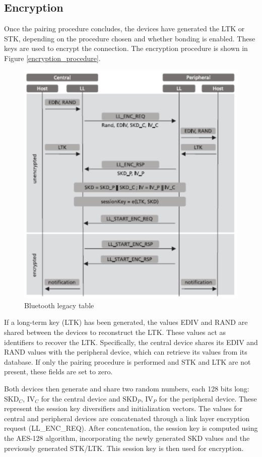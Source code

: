 \documentclass{Configuration_Files/PoliMi3i_thesis}
\begin{document}
\subsection{Encryption}

Once the pairing procedure concludes, the devices have generated the LTK or STK, depending on the procedure chosen and whether bonding is enabled. These keys are used to encrypt the connection. The encryption procedure is shown in Figure \ref{encryption_procedure}.

\begin{figure}[H]
    \centering
    \includegraphics[scale=0.7]{Bluetooth_Security/9.png}
    \caption{Bluetooth legacy table}
    \label{bluetooth_sec_9}
\end{figure}

If a long-term key (LTK) has been generated, the values EDIV and RAND are shared between the devices to reconstruct the LTK. These values act as identifiers to recover the LTK. Specifically, the central device shares its EDIV and RAND values with the peripheral device, which can retrieve its values from its database. If only the pairing procedure is performed and STK and LTK are not present, these fields are set to zero. 

Both devices then generate and share two random numbers, each 128 bits long: \( \text{SKD}_C \), \( \text{IV}_C \) for the central device and \( \text{SKD}_P \), \( \text{IV}_P \) for the peripheral device. These represent the session key diversifiers and initialization vectors. The values for central and peripheral devices are concatenated through a link layer encryption request (LL\_ENC\_REQ). After concatenation, the session key is computed using the AES-128 algorithm, incorporating the newly generated SKD values and the previously generated STK/LTK. This session key is then used for encryption.
\end{document}
